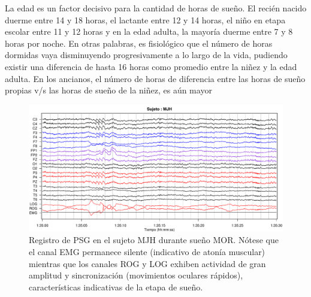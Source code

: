 La edad es un factor decisivo para la cantidad de horas de sueño. El recién nacido duerme entre 14 y 18 horas, el lactante entre 12 y 14 horas, el niño en etapa escolar entre 11 y 12 horas y en la edad adulta, la mayoría duerme entre 7 y 8 horas por noche. En otras palabras, es fisiológico que el número de horas dormidas vaya disminuyendo progresivamente a lo largo de la vida, pudiendo existir una diferencia de hasta 16 horas como promedio entre la niñez y la edad adulta. En los ancianos, el número de horas de diferencia entre las horas de sueño propias v/s las horas de sueño de la niñez, es aún mayor

\cite{Contreras13}

\begin{figure}
\centering
\includegraphics[width=\linewidth]
{./img_ejemplos/MJH_190_PDG_lucirse_PSG.pdf}
\caption{Registro de PSG en el sujeto MJH durante sue\~no MOR. N\'otese que el canal EMG permanece 
silente (indicativo de aton\'ia muscular) mientras que los canales ROG y LOG exhiben actividad de 
gran amplitud y sincronizaci\'on (movimientos oculares r\'apidos), caracter\'isticas indicativas de
la etapa de sue\~no.}
\label{ejemplos_mor}
\end{figure}

%

